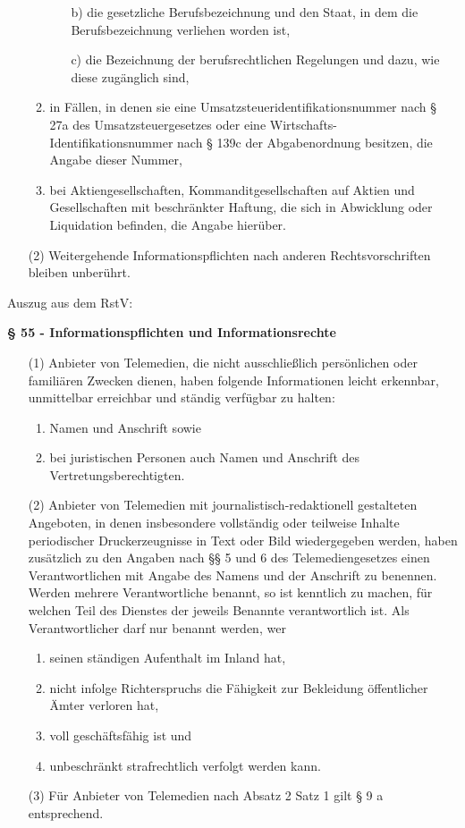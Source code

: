 \documentclass[12pt, twoside, a4paper, ngerman]{article}
\begin{document}
\begin{appendix}
\begin{itemize}
\begin{enumerate}
\begin{itemize}
      \item[b)] die gesetzliche Berufsbezeichnung und den Staat, in dem die Berufsbezeichnung verliehen worden ist,
      \item[c)] die Bezeichnung der berufsrechtlichen Regelungen und dazu, wie diese zugänglich sind,
    \end{itemize}
    \item in Fällen, in denen sie eine Umsatzsteueridentifikationsnummer nach § 27a des Umsatzsteuergesetzes oder eine Wirtschafts-Identifikationsnummer nach § 139c der Abgabenordnung besitzen, die Angabe dieser Nummer,
    \item bei Aktiengesellschaften, Kommanditgesellschaften auf Aktien und Gesellschaften mit beschränkter Haftung, die sich in Abwicklung oder Liquidation befinden, die Angabe hierüber.
  \end{enumerate}
\item[(2)] Weitergehende Informationspflichten nach anderen Rechtsvorschriften bleiben unberührt.
\end{itemize}

Auszug aus dem \ac{RstV}:

\textbf{§ 55 - Informationspflichten und Informationsrechte}
\begin{itemize}
  \item[(1)] Anbieter von Telemedien, die nicht ausschließlich persönlichen oder familiären Zwecken dienen, haben folgende Informationen leicht erkennbar, unmittelbar erreichbar und ständig verfügbar zu halten:
  \begin{enumerate}
    \item Namen und Anschrift sowie
    \item bei juristischen Personen auch Namen und Anschrift des Vertretungsberechtigten.
  \end{enumerate}
  \item[(2)] Anbieter von Telemedien mit journalistisch-redaktionell gestalteten Angeboten, in denen insbesondere vollständig oder teilweise Inhalte periodischer Druckerzeugnisse in Text oder Bild wiedergegeben werden, haben zusätzlich zu den Angaben nach §§ 5 und 6 des Telemediengesetzes einen Verantwortlichen mit Angabe des Namens und der Anschrift zu benennen. Werden mehrere Verantwortliche benannt, so ist kenntlich zu machen, für welchen Teil des Dienstes der jeweils Benannte verantwortlich ist. Als Verantwortlicher darf nur benannt werden, wer
  \begin{enumerate}
    \item seinen ständigen Aufenthalt im Inland hat,
    \item nicht infolge Richterspruchs die Fähigkeit zur Bekleidung öffentlicher Ämter verloren hat,
    \item voll geschäftsfähig ist und
    \item unbeschränkt strafrechtlich verfolgt werden kann.
  \end{enumerate}
  \item[(3)] Für Anbieter von Telemedien nach Absatz 2 Satz 1 gilt § 9 a entsprechend.
\end{itemize}


\end{appendix}
\end{document}
